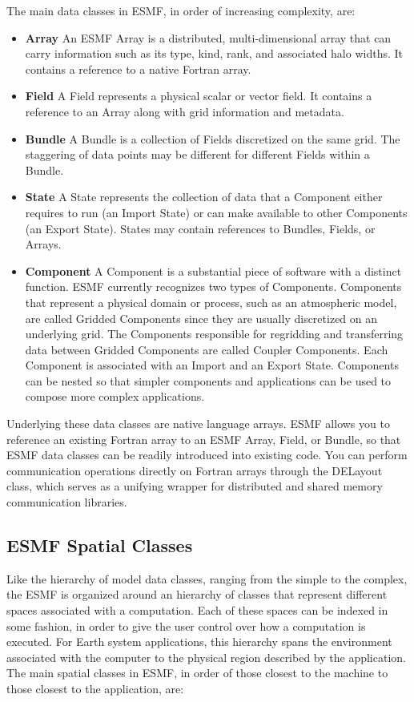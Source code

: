 The main data classes in ESMF, in order of increasing complexity, are:
\begin{itemize}
\item {\bf Array} An ESMF Array is a distributed, multi-dimensional 
array that can carry information such as its type, kind, rank, and 
associated halo widths.  It contains a reference to a native Fortran array.
\item {\bf Field}  A Field represents a physical scalar or vector field.
It contains a reference to an Array along with grid information and metadata.
\item {\bf Bundle}  A Bundle is a collection of Fields discretized 
on the same grid.  The staggering of data points may be different for 
different Fields within a Bundle.
\item {\bf State}  A State represents the collection of data that a 
Component either requires to run (an Import State) or can make 
available to other Components (an Export State).
States may contain references to Bundles, Fields, or Arrays. 
\item {\bf Component}  A Component is a substantial piece of software 
with a distinct function.  ESMF currently recognizes two types 
of Components.  Components that represent a physical domain 
or process, such 
as an atmospheric model, are called Gridded Components since they are 
usually discretized on an underlying grid.  The Components 
responsible for regridding and transferring data between Gridded 
Components are called Coupler Components.  Each Component
is associated with an Import and an Export State.  Components
can be nested so that simpler components and applications can 
be used to compose more complex applications.

\end{itemize}

Underlying these data classes are native language arrays.  ESMF allows 
you to reference an existing Fortran array to an ESMF Array, 
Field, or Bundle, so that ESMF data classes can be readily 
introduced into existing code.  You can perform communication operations 
directly on Fortran arrays through the DELayout class, which serves 
as a unifying wrapper for distributed and shared memory communication 
libraries.

\subsection{ESMF Spatial Classes}

Like the hierarchy of model data classes, ranging from the 
simple to the complex, the ESMF is organized around an hierarchy of 
classes that represent different spaces associated with a computation.
Each of these spaces can be indexed in some fashion, in order to give
the user control over how a computation is executed.  For Earth system
applications, this hierarchy spans the environment associated with the 
computer to the physical region described by the application.  
The main spatial classes in ESMF, in order of those closest to the
machine to those closest to the application, are:

